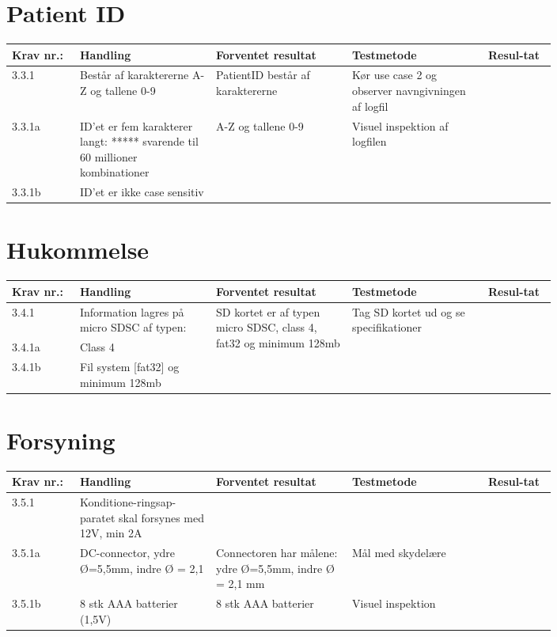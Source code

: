 			\section{Patient ID}
				\begin{longtable}{|p{0.1\linewidth}|p{0.2\linewidth}|p{0.2\linewidth}|p{0.2\linewidth}|p{0.1\linewidth}|}
					\hline
					\rowcolor{usDef}
					Krav nr.: & Handling & Forventet resultat & Testmetode & Resul-tat  \\\hline
					3.3.1 & 
					Består af karaktererne A-Z og tallene 0-9 & PatientID består af karaktererne  & Kør use case 2  og observer navngivningen af logfil & \\ \hline
					3.3.1a& ID’et er fem karakterer langt: ***** svarende til 60 millioner kombinationer & \multirow{2}{0.2\textwidth}{A-Z og tallene 0-9} & \multirow{2}{0.2\textwidth}{Visuel inspektion af logfilen}  & \multirow{2}{0.2\textwidth}{} \\ \cline{1-2}
					3.3.1b& ID’et er ikke case sensitiv  & &  & \\ \hline
				\end{longtable}
			
			\section{Hukommelse}
				\begin{longtable}{|p{0.1\linewidth}|p{0.2\linewidth}|p{0.2\linewidth}|p{0.2\linewidth}|p{0.1\linewidth}|}
					\hline
					\rowcolor{usDef}
					Krav nr.: & Handling & Forventet resultat & Testmetode & Resul-tat  \\\hline
					3.4.1& Information lagres på micro SDSC af typen: & \multirow{3}{\linewidth}{SD kortet er af typen micro SDSC, class 4, fat32 og minimum 128mb} & \multirow{3}{\linewidth}{Tag SD kortet ud og se specifikationer}  & \multirow{3}{\linewidth}{}  \\ \cline{1-2}
					3.4.1a& Class 4 & &  & \\ \cline{1-2}
					3.4.1b& Fil system [fat32] og minimum 128mb  & &  & \\ \hline
				\end{longtable}
			
			\pagebreak
			\section{Forsyning}
				\begin{longtable}{|p{0.1\linewidth}|p{0.2\linewidth}|p{0.2\linewidth}|p{0.2\linewidth}|p{0.1\linewidth}|}
					\hline
					\rowcolor{usDef}
					Krav nr.: & Handling & Forventet resultat & Testmetode & Resul-tat  \\\hline
					3.5.1& Konditione-ringsap-paratet skal forsynes med 12V, min 2A & &  & \\ \hline
					3.5.1a& DC-connector, ydre Ø=5,5mm, indre Ø = 2,1  & Connectoren har målene: ydre Ø=5,5mm, indre Ø = 2,1 mm & Mål med skydelære  & \\ \hline
					3.5.1b& 8 stk AAA batterier (1,5V)  & 8 stk AAA batterier & Visuel inspektion  & \\ \hline
				\end{longtable}
			
